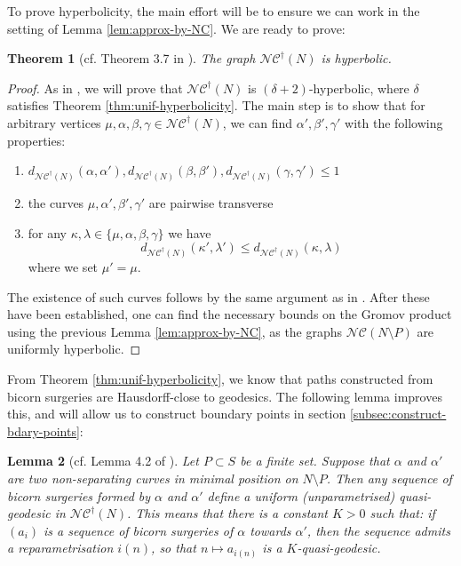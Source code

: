 \documentclass[10pt,a4paper]{amsart}
\newtheorem{theorem}{Theorem}[section]
\newtheorem{lemma}[theorem]{Lemma}
\newcommand{\ncg}{\mathcal{NC}}
\newcommand{\fncg}{\mathcal{NC}^\dagger}
\begin{document}
To prove hyperbolicity, the main effort will be to ensure we can work in the setting of Lemma \ref{lem:approx-by-NC}.
We are ready to prove:

\begin{theorem}[cf. Theorem 3.7 in \cite{BHW1}]\label{thm:fine-cg-hyperbolic}
    The graph $\fncg(N)$ is hyperbolic.
\end{theorem}

\begin{proof}
    As in \cite{BHW1}, we will prove that $\fncg(N)$ is $(\delta +2)$-hyperbolic, where $\delta$ satisfies Theorem \ref{thm:unif-hyperbolicity}.
    The main step is to show that for arbitrary vertices $\mu,\alpha,\beta,\gamma \in\fncg(N)$, we can find $\alpha', \beta', \gamma'$ with the following properties:\begin{enumerate}
        \item $d_{\fncg(N)}(\alpha,\alpha'), d_{\fncg(N)}(\beta,\beta'), d_{\fncg(N)}(\gamma,\gamma') \leq 1$
        \item the curves $\mu, \alpha', \beta', \gamma'$ are pairwise transverse
        \item for any $\kappa, \lambda \in \{\mu, \alpha,\beta,\gamma\}$ we have
        \[d_{\fncg(N)}(\kappa', \lambda') \leq d_{\fncg(N)}(\kappa, \lambda)\]
        where we set $\mu' = \mu$.
    \end{enumerate}
    The existence of such curves follows by the same argument as in \cite{BHW1}.
    After these have been established, one can find the necessary bounds on the Gromov product using the previous Lemma \ref{lem:approx-by-NC}, as the graphs $\ncg(N\setminus P)$ are uniformly hyperbolic.
\end{proof}

From Theorem \ref{thm:unif-hyperbolicity}, we know that paths constructed from bicorn surgeries are Hausdorff-close to geodesics.
The following lemma improves this, and will allow us to construct boundary points in section \ref{subsec:construct-bdary-points}:

\begin{lemma}[cf. Lemma 4.2 of \cite{BHW2}]\label{lem:nice-bicorn-paths}
Let $P\subset S$ be a finite set.
Suppose that $\alpha$ and $\alpha'$ are two non-separating curves in minimal position on $N\setminus P$.
Then any sequence of bicorn surgeries formed by $\alpha$ and $\alpha'$ define a uniform (unparametrised) quasi-geodesic in $\fncg(N)$.
This means that there is a constant $K>0$ such that:
if $(a_i)$ is a sequence of bicorn surgeries of $\alpha$ towards $\alpha'$, then the sequence admits a reparametrisation $i(n)$, so that $n\mapsto a_{i(n)}$ is a $K$-quasi-geodesic.
\end{lemma}
\end{document}
